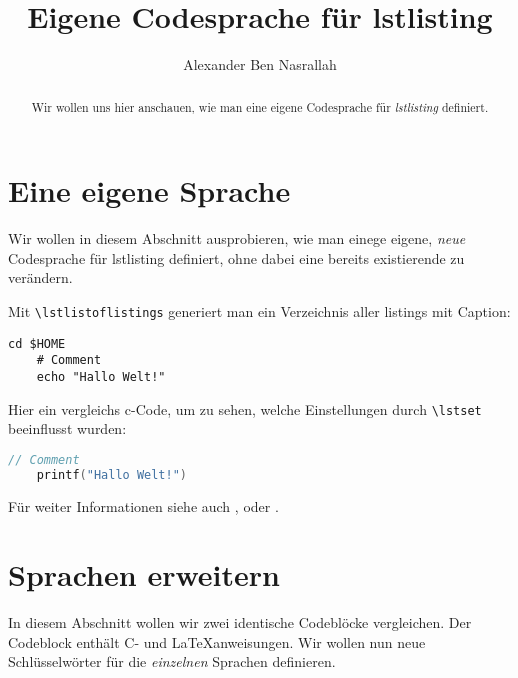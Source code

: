 \documentclass[a4paper]{article}
\title{Eigene Codesprache für lstlisting}
\author{Alexander Ben Nasrallah}
\begin{document}
\maketitle
\begin{abstract}
	Wir wollen uns hier anschauen, wie man eine eigene Codesprache für
	\emph{lstlisting} definiert.
\end{abstract}

\section{Eine eigene Sprache}
Wir wollen in diesem Abschnitt ausprobieren, wie man einege eigene, \emph{neue}
Codesprache für lstlisting definiert, ohne dabei eine bereits existierende zu
verändern.

Mit \verb+\lstlistoflistings+ generiert man ein Verzeichnis aller listings mit
Caption:
\lstlistoflistings

\begin{lstlisting}[language=cli, title=Titel, caption={Command line}]
	cd $HOME
	# Comment
	echo "Hallo Welt!"
\end{lstlisting}

Hier ein vergleichs c-Code, um zu sehen, welche Einstellungen durch
\verb+\lstset+ beeinflusst wurden:
\begin{lstlisting}[language=C, caption={c-Code mit Standardeinstellungen}]
	// Comment
	printf("Hallo Welt!")
\end{lstlisting}

Für weiter Informationen siehe auch \cite{ctanListings}, \cite{wikiListings} oder \cite{manListings}.

\printbibliography

\section{Sprachen erweitern}
In diesem Abschnitt wollen wir zwei identische Codeblöcke vergleichen. Der
Codeblock enthält C- und \LaTeX{}anweisungen. Wir wollen nun neue
Schlüsselwörter für die \emph{einzelnen} Sprachen definieren.

\end{document}
